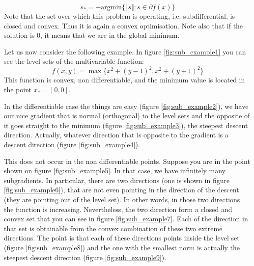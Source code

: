\begin{equation}
    s_* = - \mbox{argmin}\{\Vert s \Vert : s \in \partial f(x)\}
\end{equation}
Note that the set over which this problem is operating, i.e. subdifferential, is closed and convex. Thus it is again a convex optimisation. Note also that if the solution is 0, it means that we are in the global minimum.
\par Let us now consider the following example. In figure \ref{fig:sub_example1} you can see the level sets of the multivariable function:
\begin{equation}
    f(x,y) = \max\{x^2 + (y-1)^2, x^2 + (y+1)^2\}
\end{equation}
This function is convex, non differentiable, and the minimum value is located in the point $x_* = [0,0]$.
\par In the differentiable case the things are easy (figure \ref{fig:sub_example2}), we have our nice gradient that is normal (orthogonal) to the level sets and the opposite of it goes straight to the minimum (figure \ref{fig:sub_example3}), the steepest descent direction. Actually, whatever direction that is opposite to the gradient is a descent direction (figure \ref{fig:sub_example4}).
\par This does not occur in the non differentiable points. Suppose you are in the point shown on figure \ref{fig:sub_example5}. In that case, we have infinitely many subgradients. In particular, there are two directions (one is shown in figure \ref{fig:sub_example6}), that are not even pointing in the direction of the descent (they are pointing out of the level set). In other words, in those two directions the function is increasing. Nevertheless, the two direction form a closed and convex set that you can see in figure \ref{fig:sub_example7}. Each of the direction in that set is obtainable from the convex combination of these two extreme directions. The point is that each of these directions points inside the level set (figure \ref{fig:sub_example8}) and the one with the smallest norm is actually the steepest descent direction (figure \ref{fig:sub_example9}).
